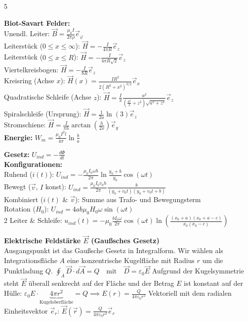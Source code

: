 \documentclass[a4paper, 2pt, landscape]{extarticle}
\begin{document}
\begin{multicols*}{5}
\begin{tcolorbox}[title={Magnetostatik \& Biot-Savart (B6, B8)}]
\textbf{Biot-Savart Felder:} \\
Unendl. Leiter: $\vec{B} = \frac{\mu_0 I}{2\pi \rho} \vec{e}_\varphi$ \\
Leiterstück ($0 \le x \le \infty$): $\vec{H} = -\frac{I}{4\pi R} \vec{e}_z$ \\
Leiterstück ($0 \le x \le R$): $\vec{H} = -\frac{I}{4\pi R \sqrt{2}} \vec{e}_z$ \\
Viertelkreisbogen: $\vec{H} = -\frac{I}{8R} \vec{e}_z$ \\
Kreisring (Achse $x$): $\vec{H}(x) = \frac{I R^2}{2(R^2+x^2)^{3/2}} \vec{e}_x$ \\
Quadratische Schleife (Achse $z$): $\vec{H} = \frac{I}{\pi} \frac{a^2}{(\frac{a^2}{2}+z^2)\sqrt{a^2+z^2}} \vec{e}_z$ \\
Spiralschleife (Ursprung): $\vec{H} = \frac{1}{2a} \ln(3) \vec{e}_z$ \\
Stromschiene: $\vec{H} = \frac{I}{\pi h} \arctan(\frac{h}{2x}) \vec{e}_y$ \\
\textbf{Energie:} $W_m = \frac{\mu_0 I^2 l}{4\pi} \ln \frac{b}{a}$
\end{tcolorbox}

\begin{tcolorbox}[title={Induktion (B7, B8)}]
\textbf{Gesetz:} $U_{ind} = -\frac{d\Phi}{dt}$ \\
\textbf{Konfigurationen:} \\
Ruhend ($i(t)$): $U_{ind} = -\frac{\mu_0 I_0 \omega h}{2\pi} \ln \frac{y_0+b}{y_0} \cos(\omega t)$ \\
Bewegt ($\vec{v}$, $I$ konst): $U_{ind} = \frac{\mu_0 I_0 v_0 h}{2\pi} \frac{b}{(y_0+v_0 t)(y_0+v_0 t+b)}$ \\
Kombiniert ($i(t)$ \& $\vec{v}$): Summe aus Trafo- und Bewegungsterm \\
Rotation ($H_0$): $U_{ind} = 4ab \mu_0 H_0 \omega \sin(\omega t)$ \\
2 Leiter \& Schleife: $u_{ind}(t) = -\mu_0 \frac{b I_0 \omega}{2\pi} \cos(\omega t) \ln \left( \frac{(x_0+a)(x_0+a-c)}{x_0(x_0-c)} \right)$
\end{tcolorbox}

\begin{tcolorbox}[title={Herleitung: Punktladung im Vakuum}, colback=white, colframe=boxtitle]
\textbf{Elektrische Feldstärke $\vec{E}$ (Gaußsches Gesetz)} \\
Ausgangspunkt ist das Gaußsche Gesetz in Integralform. Wir wählen als Integrationsfläche $A$ eine konzentrische Kugelfläche mit Radius $r$ um die Punktladung $Q$.
$\oint_{A} \vec{D} \cdot d\vec{A} = Q \quad \text{mit} \quad \vec{D} = \varepsilon_0 \vec{E}$
Aufgrund der Kugelsymmetrie steht $\vec{E}$ überall senkrecht auf der Fläche und der Betrag $E$ ist konstant auf der Hülle:
$\varepsilon_0 E \cdot \underbrace{4\pi r^2}_{\text{Kugeloberfläche}} = Q \implies E(r) = \frac{Q}{4\pi\varepsilon_0 r^2}$
Vektoriell mit dem radialen Einheitsvektor $\vec{e}_r$:
$\vec{E}(\vec{r}) = \frac{Q}{4\pi\varepsilon_0 r^2} \vec{e}_r$
\end{tcolorbox}


\end{multicols*}
\end{document}
